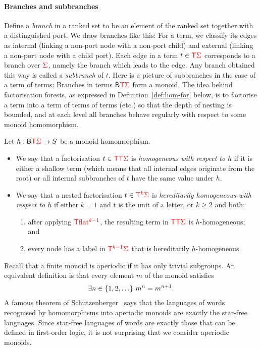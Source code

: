 \paragraph{Branches and subbranches}
Define a \emph{branch} in a ranked set to be an element  of the ranked set together with a distinguished port. 
We draw branches like  this:
For a term, we classify its edges as internal (linking a non-port node with a non-port child) and external (linking a non-port node with a child port). Each edge in a term $t \in {\color{red}{\mathsf T}} {\color{red}{\Sigma}}$ corresponds to a branch over ${\color{red}{\Sigma}}$, namely the branch which leads to the edge. Any branch obtained this way is called a \emph{subbranch} of $t$. Here is a picture of subbranches in the case of a term of terms:
Branches in  terms $\mathsf{B} {\color{red}{\mathsf T}} {\color{red}{\Sigma}}$  form a monoid. 
The idea behind factorisation forests, as expressed in Definition~\ref{def:hom-for} below, is to factorise a term into a term of terms of terms (etc.) so that the depth of nesting is bounded, and at each level all branches behave regularly with respect to some monoid homomorphism. 

\begin{definition}\label{def:hom-for}
    Let $h : \mathsf{B} {\color{red}{\mathsf T}} {\color{red}{\Sigma}} \to S$ be a monoid homomorphism.
    \begin{itemize}
\item     We say that a factorisation $t \in {\color{red}{\mathsf T}} {\color{red}{\mathsf T}} {\color{red}{\Sigma}}$ is \emph{homogeneous with respect to $h$} if it is either a shallow term (which means that all internal edges originate from the root) or all internal subbranches of $t$ have the same value under $h$.
\item We say that a nested factorisation  $t \in {\color{red}{\mathsf T}}^{{\color{red}{k}}}  {\color{red}{\Sigma}}$ is \emph{hereditarily homogeneous with respect to $h$} if either $k=1$ and $t$ is the unit of a letter, or $k \ge 2$ and both:
\begin{enumerate}
    \item  after applying ${\color{red}{\mathsf T}} {\color{red}{\mathrm{flat}}}^{{\color{red}{k-1}}}$,   the resulting term in ${\color{red}{\mathsf T}} {\color{red}{\mathsf T}} {\color{red}{\Sigma}}$ is $h$-homogeneous; and 
    \item every node has a label in ${\color{red}{\mathsf T}}^{{\color{red}{k-1}}} {\color{red}{\Sigma}}$ that is hereditarily $h$-homogeneous. 
\end{enumerate}
    \end{itemize}
\end{definition}


Recall that a finite monoid is aperiodic if it has only trivial subgroups. An equivalent definition is that every element $m$ of the monoid satisfies 
\begin{align*}
  \exists n \in \{1,2,\ldots\}\   m^n = m^{n+1}.
\end{align*} 
A famous theorem of Schutzenberger~\cite{DBLP:journals/iandc/Schutzenberger65b} says that the languages  of words recognised by homomorphisms into aperiodic monoids are exactly the star-free languages. Since star-free languages of words are exactly those that can be defined in first-order logic, it is not surprising that we consider aperiodic monoids.

